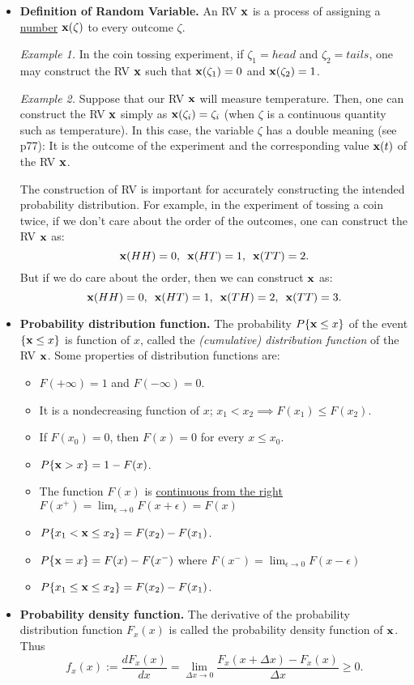 \documentclass[a4paper, oneside]{book}
\begin{document}
\begin{itemize}
\item \textbf{Definition of Random Variable.} An RV $\mathbf x$ is a process of assigning a \underline{number} $\mathbf x(\zeta)$ to every outcome $\zeta$. 

\textit{Example 1.} In the coin tossing experiment,  if $\zeta_1 = head $ and $\zeta_2 = tails$, one may construct the RV $\mathbf x$ such that $\mathbf x(\zeta_1) = 0$ and $\mathbf x(\zeta_2) = 1$.

\textit{Example 2.} Suppose that our RV $\mathbf x$ will measure temperature. Then, one can construct the RV $\mathbf x$ simply as  $\mathbf x(\zeta_i) = \zeta_i$ (\eg when $\zeta$ is a continuous quantity such as temperature). In this case, the variable $\zeta$ has a double meaning (see p77): It is the outcome of the experiment and the corresponding value $\mathbf x(t)$ of the RV $\mathbf x$.

The construction of RV is important for accurately constructing the intended probability distribution. For example, in the experiment of tossing a coin twice, if we don't care about the order of the outcomes, one can construct the RV $\mathbf x$ as: $$\mathbf x(HH) = 0, \,\,\,\mathbf x(HT)=1, \,\,\,\mathbf x(TT)=2.$$
But if we do care about the order, then we can construct $\mathbf x$ as:
$$\mathbf x(HH) = 0, \,\,\,\mathbf x(HT)=1, \,\,\,\mathbf x(TH)=2, \,\,\,\mathbf x(TT)=3.$$

\item \textbf{Probability distribution function.} The probability $P\{\mathbf x \le x \}$ of the event $\{\mathbf x\le x\}$ is function of $x$, called the \textit{(cumulative) distribution function} of the RV $\mathbf x$. Some properties of distribution functions are:
	\begin{itemize}
	\item $F(+\infty) =1$ and $F(-\infty) = 0$.
	\item It is a nondecreasing function of $x$; \ie $x_1 < x_2 \implies F(x_1) \le F(x_2)$.
	\item If $F(x_0)=0$, then $F(x)=0$ for every $x\le x_0$.
	\item $P\{\mathbf x>x\} = 1-F(x)$.
	\item The function $F(x)$ is \underline{continuous from the right} $F(x^+)=\lim_{\epsilon\to 0}F(x+\epsilon)=F(x)$
	\item $P\{x_1 < \mathbf x \le x_2\} = F(x_2) - F(x_1)$.
	\item $P\{\mathbf{x}=x\} = F(x)-F(x^-)$ where $F(x^-) = \lim_{\epsilon\to 0} F(x-\epsilon)$
	
	\item $P\{x_1 \le \mathbf x \le x_2\} = F(x_2) - F(x_1)$.
	\end{itemize}
\item \textbf{Probability density function.} The derivative of the probability distribution function $F_x(x)$ is called the probability density function of $\mathbf x$. Thus $$f_x(x) := \frac{dF_x (x)}{dx}=\lim_{\Delta x \to 0} \frac{F_x(x+\Delta x) - F_x(x)}{\Delta x} \ge 0 .$$


\end{itemize}
\end{document}
